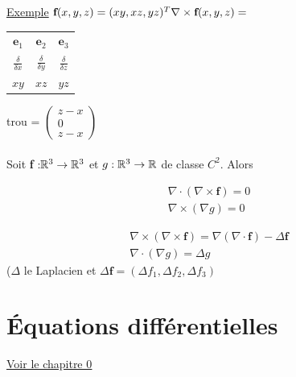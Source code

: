 \documentclass[12pt,a4paper]{article}
\begin{document}
\uline{Exemple} $\textbf{f}(x,y,z) = (xy, xz, yz)^T\\
\nabla \times \textbf{f}(x,y,z) =$ \begin{tabular}{|ccc|}
	$\textbf{e}_1$ & $\textbf{e}_2$ & $\textbf{e}_3$\\
	$\frac{\delta}{\delta x}$ & $\frac{\delta }{\delta y}$ & $\frac{\delta }{\delta z}$\\
	$xy$ & $xz$ & $yz$
\end{tabular}
{trou} = $\begin{pmatrix}
	z-x\\
	0\\
	z-x
\end{pmatrix}$\\
\\
Soit \textbf{f} :$ \mathbb{R}^3 \to \mathbb{R}^3$ et $g : \mathbb{R}^3 \to \mathbb{R}$ de classe $C^2$. Alors 
\begin{boite}[0.4]
	\begin{align*}
		\nabla \cdot (\nabla \times \textbf{f}) = 0\\
		\nabla \times (\nabla g) = 0
	\end{align*}
\end{boite}
\begin{boite}[0.5]
 	\begin{align*}
 		\nabla \times (\nabla \times \textbf{f}) = \nabla (\nabla \cdot \textbf{f}) - \Delta \textbf{f}\\
 		\nabla \cdot (\nabla g) = \Delta g
 	\end{align*}
 	($\Delta$ le Laplacien et $\Delta \textbf{f} = (\Delta f_1,\Delta f_2,\Delta f_3)$
\end{boite}

\section{Équations différentielles}
\setcounter{equation}{0}
\uline{\uline{Voir le chapitre 0}}
\end{document}
